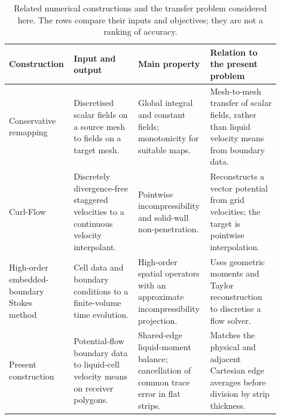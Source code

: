 \begin{table}[tbp]\centering\small
\caption{Related numerical constructions and the transfer problem considered here.
The rows compare their inputs and objectives; they are not a ranking of accuracy.}
\label{tab:related-methods}
\begin{tabular}{@{}>{\raggedright\arraybackslash}p{0.17\linewidth}
                  >{\raggedright\arraybackslash}p{0.23\linewidth}
                  >{\raggedright\arraybackslash}p{0.25\linewidth}
                  >{\raggedright\arraybackslash}p{0.25\linewidth}@{}}
\toprule
Construction & Input and output & Main property & Relation to the present problem\\
\midrule
Conservative remapping~\citep{ullrich}
& Discretised scalar fields on a source mesh to fields on a target mesh.
& Global integral and constant fields; monotonicity for suitable maps.
& Mesh-to-mesh transfer of scalar fields, rather than liquid velocity means from boundary data.\\[5pt]
Curl-Flow~\citep{curlflow}
& Discretely divergence-free staggered velocities to a continuous velocity interpolant.
& Pointwise incompressibility and solid-wall non-penetration.
& Reconstructs a vector potential from grid velocities; the target is pointwise interpolation.\\[5pt]
High-order embedded-boundary Stokes method~\citep{overton}
& Cell data and boundary conditions to a finite-volume time evolution.
& High-order spatial operators with an approximate incompressibility projection.
& Uses geometric moments and Taylor reconstruction to discretise a flow solver.\\[5pt]
Present construction
& Potential-flow boundary data to liquid-cell velocity means on receiver polygons.
& Shared-edge liquid-moment balance; cancellation of common trace error in flat strips.
& Matches the physical and adjacent Cartesian edge averages before division by strip thickness.\\
\bottomrule
\end{tabular}
\end{table}
